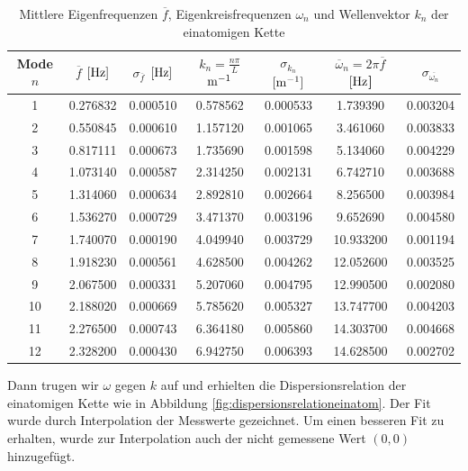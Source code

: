 \documentclass[a4paper,titlepage]{scrartcl}
\numberwithin{equation}{section}
\begin{document}
\begin{table}[H]
\centering
\begin{tabular}{c|c|c|c|c|c|c}
Mode $n$ & $\overline{f}$ $[\unit[]{Hz}]$ & $\sigma_{\overline{f}}$ $[\unit[]{Hz}]$ & $k_n=\frac{n \pi}{L}$ $\unit[]{m^{-1}}$ & $\sigma_{k_n}$ $[\unit[]{m^{-1}}]$ & $\overline{\omega}_n=2 \pi \overline{f}$ $[\unit[]{Hz}$] & $\sigma_{\overline{\omega_n}}$\\
\hline
1 & 0.276832 & 0.000510 & 0.578562 & 0.000533 & 1.739390 & 0.003204\\
2 & 0.550845 & 0.000610 & 1.157120 & 0.001065 & 3.461060 & 0.003833\\
3 & 0.817111 & 0.000673 & 1.735690 & 0.001598 & 5.134060 & 0.004229\\
4 & 1.073140 & 0.000587 & 2.314250 & 0.002131 & 6.742710 & 0.003688\\
5 & 1.314060 & 0.000634 & 2.892810 & 0.002664 & 8.256500 & 0.003984\\
6 & 1.536270 & 0.000729 & 3.471370 & 0.003196 & 9.652690 & 0.004580\\
7 & 1.740070 & 0.000190 & 4.049940 & 0.003729 & 10.933200 & 0.001194\\
8 & 1.918230 & 0.000561 & 4.628500 & 0.004262 & 12.052600 & 0.003525\\
9 & 2.067500 & 0.000331 & 5.207060 & 0.004795 & 12.990500 & 0.002080\\
10 & 2.188020 & 0.000669 & 5.785620 & 0.005327 & 13.747700 & 0.004203\\
11 & 2.276500 & 0.000743 & 6.364180 & 0.005860 & 14.303700 & 0.004668\\
12 & 2.328200 & 0.000430 & 6.942750 & 0.006393 & 14.628500 & 0.002702\\
\end{tabular}
\caption{Mittlere Eigenfrequenzen $\overline{f}$, Eigenkreisfrequenzen $\omega_n$ und Wellenvektor $k_n$ der einatomigen Kette}
\label{tab:einatomigekettemittlere}
\end{table}
Dann trugen wir $\omega$ gegen $k$ auf und erhielten die Dispersionsrelation der einatomigen Kette wie in Abbildung \ref{fig:dispersionsrelationeinatom}. Der Fit wurde durch Interpolation der Messwerte gezeichnet. Um einen besseren Fit zu erhalten, wurde zur Interpolation auch der nicht gemessene Wert $(0,0)$ hinzugefügt.
\end{document}
